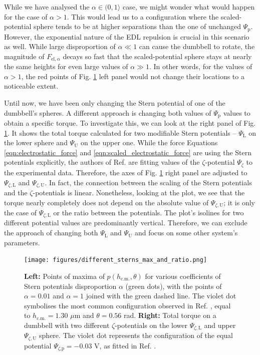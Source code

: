 \documentclass{master_thesis}
\begin{document}
While we have analysed the $\alpha\in (0, 1\rangle$ case, we might wonder what would happen for the case of $\alpha>1$. This would lead us to a configuration where the scaled-potential sphere tends to be at higher separations than the one of unchanged $\Psi_{\textrm{p}}$. However, the exponential nature of the EDL repulsion is crucial in this scenario as well. While large disproportion of $\alpha \ll 1$ can cause the dumbbell to rotate, the magnitude of $F_{\textrm{el},\alpha}$ decays so fast that the scaled-potential sphere stays at nearly the same heights for even large values of $\alpha \gg 1$. In other words, for the values of $\alpha>1$, the red points of Fig. \ref{fig:different_sterns_max_and_ratio} left panel would not change their locations to a noticeable extent.

Until now, we have been only changing the Stern potential of one of the dumbbell's spheres. A different approach is changing both values of $\Psi_\textrm{p}$ values to obtain a specific torque. To investigate this, we can look at the right panel of Fig. \ref{fig:different_sterns_max_and_ratio}. It shows the total torque calculated for two modifiable Stern potentials -- $\Psi_{\textrm{L}}$ on the lower sphere  and $\Psi_{\textrm{U}}$ on the upper one. While the force Equations \eqref{eqn:electrostatic_force} and \eqref{eqn:scaled_electrostatic_force} are using the Stern potentials explicitly, the authors of Ref. \cite{verweij2021} are fitting values of the $\zeta$-potential $\Psi_{\zeta}$ to the experimental data. Therefore, the axes of Fig. \ref{fig:different_sterns_max_and_ratio} right panel are adjusted to $\Psi_{\zeta,\textrm{L}}$ and $\Psi_{\zeta,\textrm{U}}$. In fact, the connection between the scaling of the Stern potentials and the $\zeta$-potentials is linear. Nonetheless, looking at the plot, we see that the torque nearly completely does not depend on the absolute value of $\Psi_{\zeta,\textrm{U}}$; it is only the case of $\Psi_{\zeta,\textrm{L}}$ or the ratio between the potentials. The plot's isolines for two different potential values are predominantly vertical. Therefore, we can exclude the approach of changing both $\Psi_{\textrm{L}}$ and $\Psi_{\textrm{U}}$ and focus on some other system's parameters.

\begin{figure}
    \centering
    \texttt{[image: figures/different\_sterns\_max\_and\_ratio.png]}
    \caption{\textbf{Left:} Points of maxima of $p(h_{\textrm{c.m.}},\theta)$ for various coefficients of Stern potentials disproportion $\alpha$ (green dots), with the points of $\alpha=0.01$ and $\alpha=1$ joined with the green dashed line. The violet dot symbolises the most common configuration observed in Ref. \cite{verweij2021}, equal to $h_{\textrm{c.m.}}=1.30$ $\mu$m and $\theta=0.56$ rad. \textbf{Right:} Total torque on a dumbbell with two different $\zeta$-potentials on the lower $\Psi_{\zeta,\textrm{L}}$ and upper $\Psi_{\zeta,\textrm{U}}$ sphere. The violet dot represents the configuration of the equal potential $\Psi_{\zeta\textrm{,p}} = -0.03$ V, as fitted in Ref. \cite{verweij2021}.}
    \label{fig:different_sterns_max_and_ratio}
\end{figure}
\end{document}
